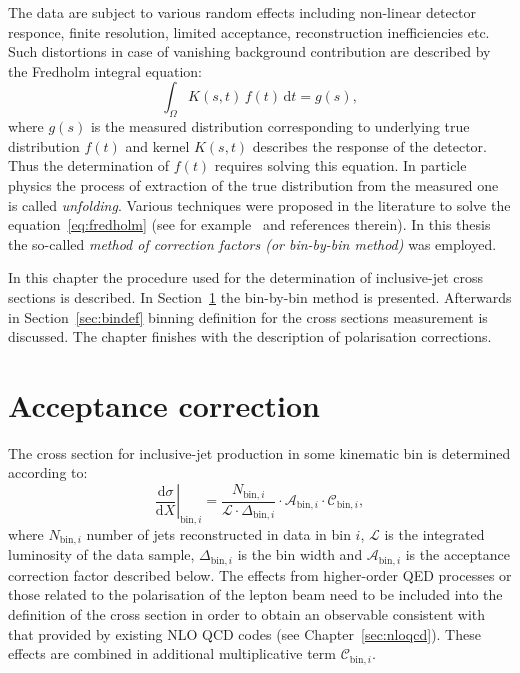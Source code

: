 The data are subject to various random effects including non-linear detector responce, finite resolution, limited acceptance, reconstruction inefficiencies etc. Such distortions in case of vanishing background contribution are described by the Fredholm integral equation:
\begin{equation}
 \int_\Omega K\left(s,t\right)\,f\left(t\right)\,\mathrm{d}t = g\left(s\right),
 \label{eq:fredholm}
\end{equation}
where $g\left(s\right)$ is the measured distribution corresponding to underlying true distribution $f\left(t\right)$ and kernel $K\left(s,t\right)$ describes the response of the detector. Thus the determination of $f\left(t\right)$ requires solving this equation.
In particle physics the process of extraction of the true distribution from the measured one is called \emph{unfolding}. Various techniques were proposed in the literature to solve the equation~\ref{eq:fredholm} (see for example~\cite{statistics book page 187} and references therein). In this thesis the so-called \emph{method of correction factors (or bin-by-bin method)} was employed.

In this chapter the procedure used for the determination of inclusive-jet cross sections is described. In Section~\ref{sec:acccor} the bin-by-bin method is presented. Afterwards in Section~\ref{sec:bindef} binning definition for the cross sections measurement is discussed. The chapter finishes with the description of polarisation corrections.

\section{Acceptance correction}
\label{sec:acccor}
The cross section for inclusive-jet production in some kinematic bin is determined according to:
\begin{equation}
 \left.\frac{\mathrm{d}\sigma}{\mathrm{d}X}\right|_{\mathrm{bin},i} = \frac{N_{\mathrm{bin},i}}{\mathcal{L} \cdot \Delta_{\mathrm{bin},i}} \cdot \mathcal{A}_{\mathrm{bin},i} \cdot \mathcal{C}_{\mathrm{bin},i},
\end{equation}
where $N_{\mathrm{bin},i}$ number of jets reconstructed in data in bin $i$, $\mathcal{L}$ is the integrated luminosity of the data sample, $\Delta_{\mathrm{bin},i}$ is the bin width and $\mathcal{A}_{\mathrm{bin},i}$ is the acceptance correction factor described below. The effects from higher-order QED processes or those related to the polarisation of the lepton beam need to be included into the definition of the cross section in order to obtain an observable consistent with that provided by existing NLO QCD codes (see Chapter~\ref{sec:nloqcd}). These effects are combined in additional multiplicative term $\mathcal{C}_{\mathrm{bin},i}$.

